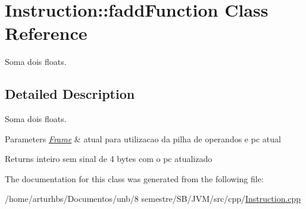 \hypertarget{classInstruction_1_1faddFunction}{}\section{Instruction\+:\+:fadd\+Function Class Reference}
\label{classInstruction_1_1faddFunction}


Soma dois floats.  




\subsection{Detailed Description}
Soma dois floats. 


\begin{DoxyParams}{Parameters}
{\em \hyperlink{classFrame}{Frame}} & atual para utilizacao da pilha de operandos e pc atual \\
\hline
\end{DoxyParams}
\begin{DoxyReturn}{Returns}
inteiro sem sinal de 4 bytes com o pc atualizado 
\end{DoxyReturn}


The documentation for this class was generated from the following file\+:\begin{DoxyCompactItemize}
\item 
/home/arturhbs/\+Documentos/unb/8 semestre/\+S\+B/\+J\+V\+M/src/cpp/\hyperlink{Instruction_8cpp}{Instruction.\+cpp}\end{DoxyCompactItemize}
